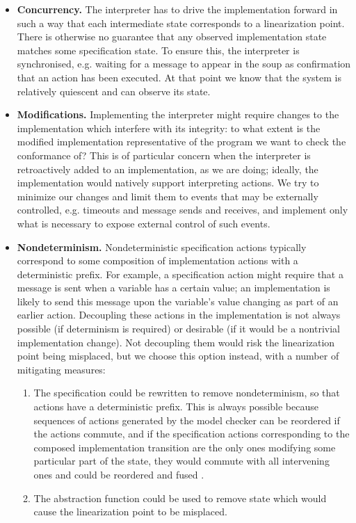 \documentclass[a4paper]{article}
\begin{document}
\begin{itemize}
\item \textbf{Concurrency.} The interpreter has to drive the implementation forward in such a way that each intermediate state corresponds to a linearization point. There is otherwise no guarantee that any observed implementation state matches some specification state. To ensure this, the interpreter is synchronised, e.g. waiting for a message to appear in the soup as confirmation that an action has been executed. At that point we know that the system is relatively quiescent and can observe its state.

\item \textbf{Modifications.} Implementing the interpreter might require changes to the implementation which interfere with its integrity: to what extent is the modified implementation representative of the program we want to check the conformance of? This is of particular concern when the interpreter is retroactively added to an implementation, as we are doing; ideally, the implementation would natively support interpreting actions. We try to minimize our changes and limit them to events that may be externally controlled, e.g. timeouts and message sends and receives, and implement only what is necessary to expose external control of such events.


\item \textbf{Nondeterminism.} Nondeterministic specification actions typically correspond to some composition of implementation actions with a deterministic prefix. For example, a specification action might require that a message is sent when a variable has a certain value; an implementation is likely to send this message upon the variable's value changing as part of an earlier action. Decoupling these actions in the implementation is not always possible (if determinism is required) or desirable (if it would be a nontrivial implementation change). Not decoupling them would risk the linearization point being misplaced, but we choose this option instead, with a number of mitigating measures:

\begin{enumerate}
\item The specification could be rewritten to remove nondeterminism, so that actions have a deterministic prefix. This is always possible because sequences of actions generated by the model checker can be reordered if the actions commute, and if the specification actions corresponding to the composed implementation transition are the only ones modifying some particular part of the state, they would commute with all intervening ones and could be reordered and fused \cite{lipton1975reduction}.
\item The abstraction function could be used to remove state which would cause the linearization point to be misplaced.
\end{enumerate}

\end{itemize}
\end{document}
